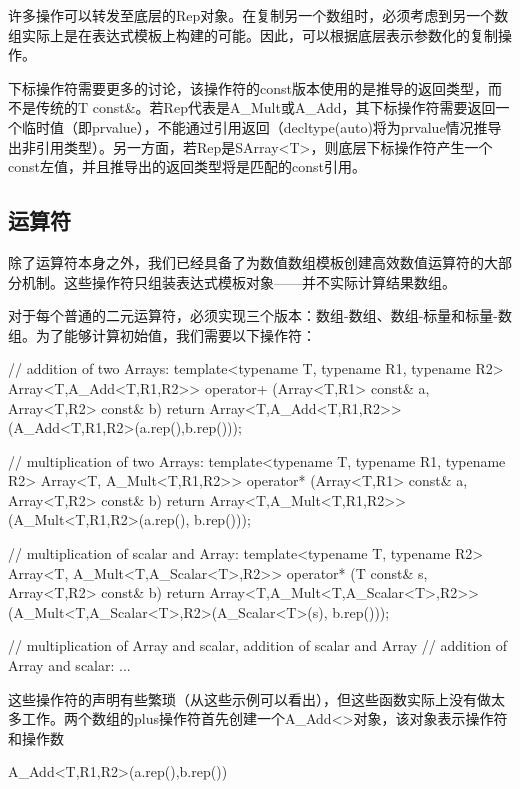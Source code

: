 许多操作可以转发至底层的Rep对象。在复制另一个数组时，必须考虑到另一个数组实际上是在表达式模板上构建的可能。因此，可以根据底层表示参数化的复制操作。

下标操作符需要更多的讨论，该操作符的const版本使用的是推导的返回类型，而不是传统的T const\&。若Rep代表是A\_Mult或A\_Add，其下标操作符需要返回一个临时值（即prvalue），不能通过引用返回（decltype(auto)将为prvalue情况推导出非引用类型）。另一方面，若Rep是SArray<T>，则底层下标操作符产生一个const左值，并且推导出的返回类型将是匹配的const引用。

\subsection{运算符}

除了运算符本身之外，我们已经具备了为数值数组模板创建高效数值运算符的大部分机制。这些操作符只组装表达式模板对象——并不实际计算结果数组。

对于每个普通的二元运算符，必须实现三个版本：数组-数组、数组-标量和标量-数组。为了能够计算初始值，我们需要以下操作符：

\begin{cpp}
// addition of two Arrays:
template<typename T, typename R1, typename R2>
Array<T,A_Add<T,R1,R2>>
operator+ (Array<T,R1> const& a, Array<T,R2> const& b) {
	return Array<T,A_Add<T,R1,R2>>
		(A_Add<T,R1,R2>(a.rep(),b.rep()));
}

// multiplication of two Arrays:
template<typename T, typename R1, typename R2>
Array<T, A_Mult<T,R1,R2>>
operator* (Array<T,R1> const& a, Array<T,R2> const& b) {
	return Array<T,A_Mult<T,R1,R2>>
		(A_Mult<T,R1,R2>(a.rep(), b.rep()));
}

// multiplication of scalar and Array:
template<typename T, typename R2>
Array<T, A_Mult<T,A_Scalar<T>,R2>>
operator* (T const& s, Array<T,R2> const& b) {
	return Array<T,A_Mult<T,A_Scalar<T>,R2>>
		(A_Mult<T,A_Scalar<T>,R2>(A_Scalar<T>(s), b.rep()));
}

// multiplication of Array and scalar, addition of scalar and Array
// addition of Array and scalar:
...
\end{cpp}

这些操作符的声明有些繁琐（从这些示例可以看出），但这些函数实际上没有做太多工作。两个数组的plus操作符首先创建一个A\_Add<>对象，该对象表示操作符和操作数

\begin{cpp}
A_Add<T,R1,R2>(a.rep(),b.rep())
\end{cpp}

